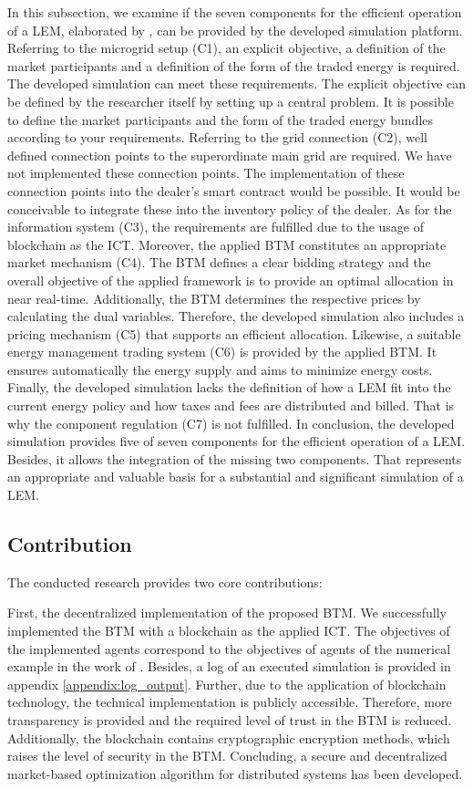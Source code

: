 In this subsection, we examine if the seven components for the efficient operation of a LEM,
 elaborated by , can be 
provided by the developed simulation platform.
Referring to the microgrid setup (C1), an explicit objective, a definition of the market participants and a definition of the form of the traded energy is required. The developed simulation can meet these requirements. The explicit objective can be defined by the researcher itself by setting up a central problem. It is possible to define the market participants and the form of the traded energy bundles
according to your requirements.
Referring to the grid connection (C2), well defined connection points to the superordinate main grid are required.
We have not implemented these connection points. 
The implementation of these connection points into the dealer's smart contract would be possible. 
It would be conceivable to integrate these into the inventory policy of the dealer.
As for the information system (C3), the requirements are fulfilled due to the usage of blockchain as the ICT.
Moreover, the applied BTM constitutes an appropriate market mechanism (C4). The BTM defines a clear bidding strategy and the overall objective of the applied framework is to provide an optimal allocation in near real-time. 
Additionally, the BTM determines the respective prices by calculating the dual variables.
Therefore, the developed simulation also includes a pricing mechanism (C5) that supports an efficient allocation.
Likewise, a suitable energy management trading system (C6) is provided by the applied BTM. 
It ensures automatically the energy supply and aims to minimize energy costs.
Finally, the developed simulation lacks the definition of how a LEM fit into the current energy policy and how taxes and fees are distributed and billed. 
That is why the component regulation (C7) is not fulfilled. 
In conclusion, the developed simulation provides five of seven components for the efficient operation of a LEM. 
Besides, it allows the integration of the missing two components.
That represents an appropriate and valuable basis for a substantial and significant simulation of a LEM. 

\subsection{Contribution}
The conducted research provides two core contributions:

First, the decentralized implementation of the proposed BTM. 
We successfully implemented the BTM with a blockchain as the applied ICT. 
The objectives of the implemented agents correspond to the 
objectives of agents of the numerical example in the work of .
Besides, a log of an executed simulation is provided in appendix \ref{appendix:log_output}.
Further, due to the application of blockchain technology, the technical implementation
is publicly accessible.
Therefore, more transparency is provided and the required level of trust in the BTM
is reduced. Additionally, the blockchain contains cryptographic encryption methods,
which raises the level of security in the BTM.
Concluding, a secure and decentralized market-based optimization algorithm for distributed systems has 
been developed.

